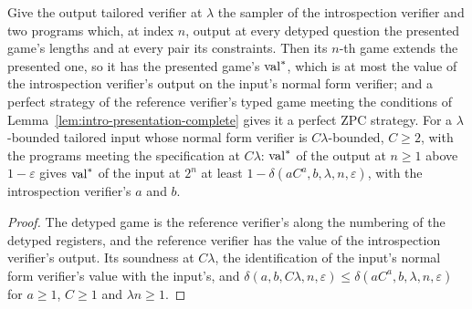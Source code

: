 \begin{lemma}
\label{lem:intro-output}
\leanok
Give the output tailored verifier at $\lambda$ the sampler of the introspection verifier and two
programs which, at index $n$, output at every detyped question the presented game's lengths and
at every pair its constraints. Then its $n$-th game extends the presented one, so it has the
presented game's $\mathrm{val}^*$, which is at most the value of the introspection verifier's output on
the input's normal form verifier; and a perfect strategy of the reference verifier's typed game
meeting the conditions of Lemma~\ref{lem:intro-presentation-complete} gives it a perfect ZPC
strategy. For a $\lambda$-bounded tailored input whose normal form verifier is $C\lambda$-bounded,
$C \geq 2$, with the programs meeting the specification at $C\lambda$: $\mathrm{val}^*$ of the output at
$n \geq 1$ above $1 - \varepsilon$ gives $\mathrm{val}^*$ of the input at $2^n$ at least
$1 - \delta(aC^a, b, \lambda, n, \varepsilon)$, with the introspection verifier's $a$ and $b$.
\end{lemma}

\begin{proof}
\leanok
The detyped game is the reference verifier's along the numbering of the detyped registers, and
the reference verifier has the value of the introspection verifier's output. Its soundness at
$C\lambda$, the identification of the input's normal form verifier's value with the input's, and
$\delta(a, b, C\lambda, n, \varepsilon) \le \delta(aC^a, b, \lambda, n, \varepsilon)$ for $a \geq 1$,
$C \geq 1$ and $\lambda n \geq 1$.
\end{proof}

